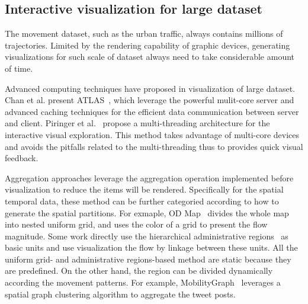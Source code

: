 \subsection{Interactive visualization for large dataset}
The movement dataset, such as the urban traffic, always contains millions of trajectories. Limited by the rendering capability of graphic devices, generating visualizations for such scale of dataset always need to take considerable amount of time. 

Advanced computing techniques have proposed in visualization of large dataset. Chan et al. present ATLAS~\cite{chan2008maintaining},  which leverage the powerful mulit-core server and advanced caching techniques for the efficient data communication between server and client.  Piringer et al.~\cite{piringer2009multi} propose a multi-threading architecture for the interactive visual exploration. This method takes advantage of multi-core devices and avoids the pitfalls related to the multi-threading thus to provides quick visual feedback.  

Aggregation approaches leverage the aggregation operation implemented before visualization to reduce the items will be rendered. Specifically for the spatial temporal data, these method can be further categoried according to how to generate the spatial partitions. For exmaple, OD Map~\cite{wood2010visualisation} divides the whole map into nested uniform grid, and uses the color of a grid to present the flow magnitude.     
Some work directly use the hierarchical administrative regions~\cite{guo2009flow} as basic units and use visualization the flow by linkage between these units. All the uniform grid- and administrative regions-based method are static because they are predefined. On the other hand, the region can be divided dynamically according the movement patterns. For example, MobilityGraph~\cite{von2015mobilitygraphs} leverages a spatial graph clustering algorithm to aggregate the tweet posts. 



